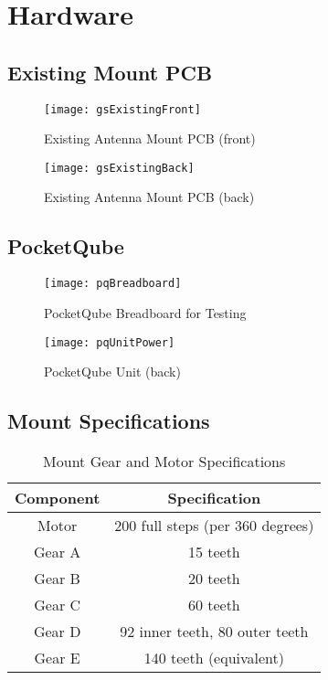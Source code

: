 \chapter{Hardware}
\section{Existing Mount PCB}\label{sec:appendix_gs_pcb_existing}
\begin{figure}[!htb]
  \centering
  \texttt{[image: gsExistingFront]}
  \caption{Existing Antenna Mount PCB (front)}
  \label{fig:gsExistingFront}
\end{figure}
\begin{figure}[!htb]
  \centering
  \texttt{[image: gsExistingBack]}
  \caption{Existing Antenna Mount PCB (back)}
  \label{fig:gsExistingBack}
\end{figure}
\newpage

\section{PocketQube}\label{sec:appendix_pq}
\begin{figure}[!htb]
    \centering
    \texttt{[image: pqBreadboard]}
    \caption{PocketQube Breadboard for Testing}
    \label{fig:pqBreadboard}
\end{figure}
\begin{figure}[!htb]
  \centering
  \texttt{[image: pqUnitPower]}
  \caption{PocketQube Unit (back)}
  \label{fig:pqUnitPower}
\end{figure}
\newpage

\section{Mount Specifications}\label{sec:appendix_mount_specifications}
\begin{table}[!htb]
  \centering
  \renewcommand{\arraystretch}{1.2}
  \begin{tabular}{ |c|c| }
  \hline
  \textbf{Component}        & \textbf{Specification}    \\
  \hline
  Motor         & 200 full steps (per 360 degrees) \\ \hline
  Gear A        & 15 teeth \\ \hline
  Gear B        & 20 teeth \\ \hline
  Gear C        & 60 teeth \\ \hline
  Gear D        & 92 inner teeth, 80 outer teeth \\ \hline
  Gear E        & 140 teeth (equivalent) \\ \hline
  \end{tabular}
  \caption{Mount Gear and Motor Specifications}
  \label{tab:mount_specifications}
\end{table}

